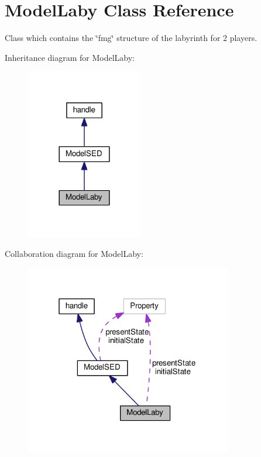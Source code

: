 \hypertarget{class_model_laby}{}\section{Model\+Laby Class Reference}
\label{class_model_laby}


Class which contains the \char`\"{}fmg\char`\"{} structure of the labyrinth for 2 players.  




Inheritance diagram for Model\+Laby\+:
\nopagebreak
\begin{figure}[H]
\begin{center}
\leavevmode
\includegraphics[width=144pt]{class_model_laby__inherit__graph}
\end{center}
\end{figure}


Collaboration diagram for Model\+Laby\+:
\nopagebreak
\begin{figure}[H]
\begin{center}
\leavevmode
\includegraphics[width=256pt]{class_model_laby__coll__graph}
\end{center}
\end{figure}

